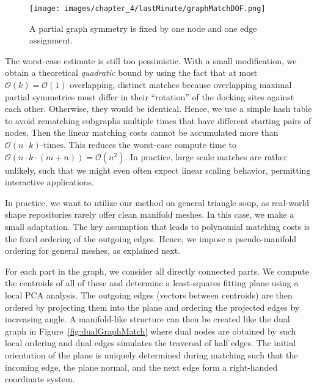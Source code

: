 \begin{figure}[t!]
	\centering
		\texttt{[image: images/chapter\_4/lastMinute/graphMatchDOF.png]}
	\caption{A partial graph symmetry is fixed by one node and one edge assignment.}
	\label{fig:graphMatchDOF}
\vnudge
\end{figure}

The worst-case estimate is still too pessimistic. With a small modification, we obtain a theoretical \emph{quadratic} bound by using the fact that at most $\mathcal{O}(k)=\mathcal{O}(1)$ overlapping, distinct matches because overlapping maximal partial symmetries must differ in their ``rotation'' of the docking sites against each other. Otherwise, they would be identical. Hence, we use a simple hash table to avoid rematching subgraphs multiple times that have different starting pairs of nodes. Then the linear matching costs cannot be accumulated more than $\mathcal{O}(n \cdot k)$-times. This reduces the worst-case compute time to $\mathcal{O}(n \cdot k \cdot (m+n)) = \mathcal{O}(n^2)$. In practice, large scale matches are rather unlikely, such that we might even often expect linear scaling behavior, permitting interactive applications.

In practice, we want to utilize our method on general triangle soup, as real-world shape repositories rarely offer clean manifold meshes. In this case, we make a small adaptation. The key assumption that leads to polynomial matching costs is the fixed ordering of the outgoing edges. %
 Hence, we impose a pseudo-manifold ordering for general meshes, as explained next.

For each part in the graph, we consider all directly connected parts. We compute the centroids of all of these and determine a least-squares fitting plane using a local PCA analysis. The outgoing edges (vectors between centroids) are then ordered by projecting them into the plane and ordering the projected edges by increasing angle. A manifold-like structure can then be created like the dual graph in Figure~\ref{fig:dualGraphMatch} where dual nodes are obtained by such local ordering and dual edges simulates the traversal of half edges. The initial orientation of the plane is uniquely determined during matching such that the incoming edge, the plane normal, and the next edge %
form a right-handed coordinate system. %

